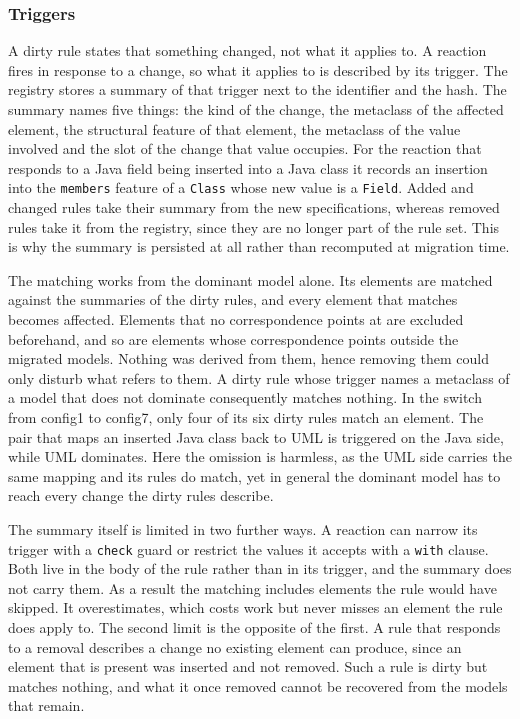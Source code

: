\subsubsection{Triggers}
\label{sec:Concept:Migration:SelectiveMigration:Triggers}

A dirty rule states that something changed, not what it applies to.
A reaction fires in response to a change, so what it applies to is described by its trigger.
The registry stores a summary of that trigger next to the identifier and the hash.
The summary names five things: the kind of the change, the metaclass of the affected element, the structural feature of that element, the metaclass of the value involved and the slot of the change that value occupies.
For the reaction that responds to a Java field being inserted into a Java class it records an insertion into the \texttt{members} feature of a \texttt{Class} whose new value is a \texttt{Field}.
Added and changed rules take their summary from the new specifications, whereas removed rules take it from the registry, since they are no longer part of the rule set.
This is why the summary is persisted at all rather than recomputed at migration time.

The matching works from the dominant model alone.
Its elements are matched against the summaries of the dirty rules, and every element that matches becomes affected.
Elements that no correspondence points at are excluded beforehand, and so are elements whose correspondence points outside the migrated models.
Nothing was derived from them, hence removing them could only disturb what refers to them.
A dirty rule whose trigger names a metaclass of a model that does not dominate consequently matches nothing.
In the switch from config1 to config7, only four of its six dirty rules match an element.
The pair that maps an inserted Java class back to UML is triggered on the Java side, while UML dominates.
Here the omission is harmless, as the UML side carries the same mapping and its rules do match, yet in general the dominant model has to reach every change the dirty rules describe.

The summary itself is limited in two further ways.
A reaction can narrow its trigger with a \texttt{check} guard or restrict the values it accepts with a \texttt{with} clause.
Both live in the body of the rule rather than in its trigger, and the summary does not carry them.
As a result the matching includes elements the rule would have skipped.
It overestimates, which costs work but never misses an element the rule does apply to.
The second limit is the opposite of the first.
A rule that responds to a removal describes a change no existing element can produce, since an element that is present was inserted and not removed.
Such a rule is dirty but matches nothing, and what it once removed cannot be recovered from the models that remain.

